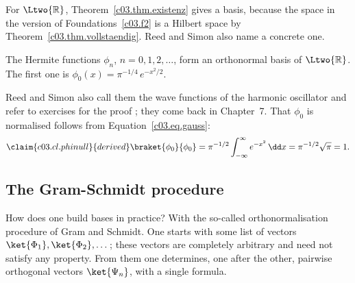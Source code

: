 \begin{vertiefung}
  For $\Ltwo{\mathbb{R}}$, Theorem~\ref{c03.thm.existenz} gives a basis, because the space in
  the version of Foundations~\ref{c03.f2} is a Hilbert space by
  Theorem~\ref{c03.thm.vollstaendig}. Reed and Simon also name a concrete one.

  \begin{theorem}\label{c03.thm.hermite}
    The Hermite functions $\phi_n$, $n = 0, 1, 2, \dots$, form an orthonormal basis of
    $\Ltwo{\mathbb{R}}$. The first one is $\phi_0(x) = \pi^{-1/4}\, e^{-x^2/2}$.
  \end{theorem}

  Reed and Simon also call them the wave functions of the harmonic oscillator and refer to
  exercises for the proof ; they come back in Chapter~7. That
  $\phi_0$ is normalised follows from Equation~\eqref{c03.eq.gauss}:
  \begin{equation}\label{c03.eq.phinull}\claim{c03.cl.phinull}{derived}
    \braket{\phi_0}{\phi_0} = \pi^{-1/2} \int_{-\infty}^{\infty} e^{-x^2}\, \dd x
    = \pi^{-1/2} \sqrt{\pi} = 1 .
  \end{equation}
\end{vertiefung}

\subsection{The Gram-Schmidt procedure}\label{c03.s7.1}

How does one build bases in practice? With the so-called orthonormalisation procedure of Gram
and Schmidt. One starts with some list of vectors $\ket{\Phi_1}, \ket{\Phi_2}, \dots$; these
vectors are completely arbitrary and need not satisfy any property. From them one determines,
one after the other, pairwise orthogonal vectors $\ket{\Psi_n}$, with a single formula.

